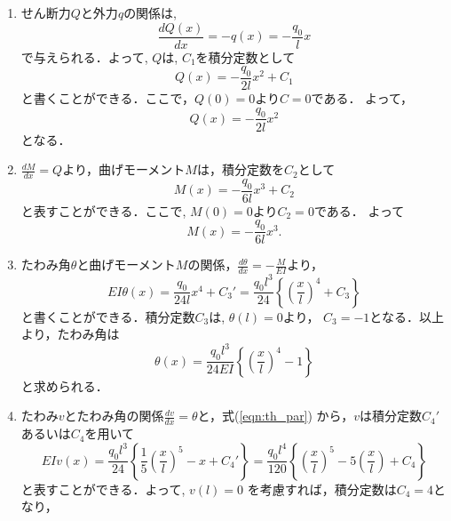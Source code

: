 \documentclass[10pt,a4j]{jarticle}
\begin{document}
\begin{enumerate}
\item
せん断力$Q$と外力$q$の関係は,
\begin{equation}
	\frac{dQ(x)}{dx} = -q(x) = -\frac{q_0}{l}x
	\label{eqn:Q_q}
\end{equation}
で与えられる．よって, $Q$は, $C_1$を積分定数として
\begin{equation}
	Q(x) =	-\frac{q_0}{2l}x^2+C_1
	\label{eqn:Q_gen}
\end{equation}
と書くことができる．ここで，$Q\left(0 \right)=0$より$C=0$である．
よって，
\begin{equation}
	Q(x) = -\frac{q_0}{2l}x^2
	\label{eqn:Q_par}
\end{equation}
となる．
\item
$\frac{dM}{dx}=Q$より，曲げモーメント$M$は，積分定数を$C_2$として
\begin{equation}
	M(x) =
	-\frac{q_0}{6l}x^3+C_2
	\label{eqn:M_gen}
\end{equation}
と表すことができる．ここで, $M\left(0\right)=0$より$C_2=0$である．
よって
\begin{equation}
	M(x) = 
	-\frac{q_0}{6l}x^3.
	\label{eqn:M_par}
\end{equation}
\item
たわみ角$\theta$と曲げモーメント$M$の関係，$\frac{d\theta}{dx}=-\frac{M}{EI}$より，
\begin{equation}
	EI \theta(x) = 
	\frac{q_0}{24l}x^4+C_3' =
	\frac{q_0l^3}{24}\left\{
		\left(\frac{x}{l}\right)^4+C_3
	\right\}
	\label{eqn:th_gen}
\end{equation}
と書くことができる．積分定数$C_3$は, $\theta\left(l\right)=0$より，
$C_3=-1$となる．以上より，たわみ角は
\begin{equation}
	\theta(x) = 
	\frac{q_0l^3}{24EI}\left\{
		\left(\frac{x}{l}\right)^4-1
	\right\}
	\label{eqn:th_par}
\end{equation}
と求められる．
\item
たわみ$v$とたわみ角の関係$\frac{dv}{dx}=\theta$と，式(\ref{eqn:th_par})
から，$v$は積分定数$C_4'$あるいは$C_4$を用いて
\begin{equation}
	EIv(x) = 
	\frac{q_0l^3}{24}\left\{
		\frac{1}{5}\left(\frac{x}{l}\right)^5-x + C_4'
	\right\}
	=
	\frac{q_0l^4}{120}\left\{
		\left(\frac{x}{l}\right)^5
		-
		5
		\left(\frac{x}{l}\right) 
		+ C_4
	\right\}
	\label{eqn:v_gen}
\end{equation}
と表すことができる．よって, $v\left(l \right)=0$
を考慮すれば，積分定数は$C_4=4$となり，
\begin{equation}

\end{equation}
\end{enumerate}
\end{document}

